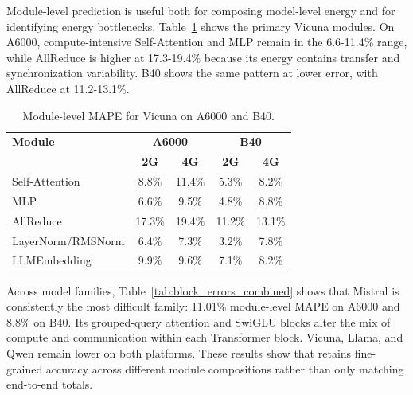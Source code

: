 Module-level prediction is useful both for composing model-level energy and for identifying energy bottlenecks. Table~\ref{tab:module_mape_combined} shows the primary Vicuna modules. On A6000, compute-intensive Self-Attention and MLP remain in the 6.6-11.4\% range, while AllReduce is higher at 17.3-19.4\% because its energy contains transfer and synchronization variability. B40 shows the same pattern at lower error, with AllReduce at 11.2-13.1\%.

\begin{table}[t]
\centering
\small
\setlength{\tabcolsep}{3.5pt}
\renewcommand{\arraystretch}{1.04}
\begin{tabular}{lcccc}
\toprule
\textbf{Module} & \multicolumn{2}{c}{\textbf{A6000}} & \multicolumn{2}{c}{\textbf{B40}} \\
 & \textbf{2G} & \textbf{4G} & \textbf{2G} & \textbf{4G} \\
\midrule
\rowcolor{rowblue} Self-Attention & 8.8\% & 11.4\% & 5.3\% & 8.2\% \\
MLP & 6.6\% & 9.5\% & 4.8\% & 8.8\% \\
\rowcolor{rowblue} AllReduce & 17.3\% & 19.4\% & 11.2\% & 13.1\% \\
LayerNorm/RMSNorm & 6.4\% & 7.3\% & 3.2\% & 7.8\% \\
\rowcolor{rowblue} LLMEmbedding & 9.9\% & 9.6\% & 7.1\% & 8.2\% \\
\bottomrule
\end{tabular}
\vspace{5pt}
\caption{Module-level MAPE for Vicuna on A6000 and B40.}
\label{tab:module_mape_combined}
\vspace{-5pt}
\end{table}

Across model families, Table~\ref{tab:block_errors_combined} shows that Mistral is consistently the most difficult family: 11.01\% module-level MAPE on A6000 and 8.8\% on B40. Its grouped-query attention and SwiGLU blocks alter the mix of compute and communication within each Transformer block. Vicuna, Llama, and Qwen remain lower on both platforms. These results show that \sys{} retains fine-grained accuracy across different module compositions rather than only matching end-to-end totals.

